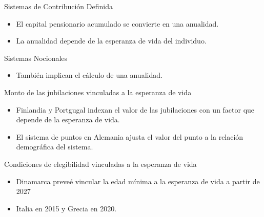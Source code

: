 \documentclass[ignorenonframetext,]{beamer}
\providecommand{\tightlist}{%
  \setlength{\itemsep}{0pt}\setlength{\parskip}{0pt}}
\begin{document}
\begin{frame}{Sistemas de Contribución Definida}

\begin{itemize}
\tightlist
\item
  El capital pensionario acumulado se convierte en una anualidad.
\item
  La anualidad depende de la esperanza de vida del individuo.
\end{itemize}

\end{frame}

\begin{frame}{Sistemas Nocionales}

\begin{itemize}
\tightlist
\item
  También implican el cálculo de una anualidad.
\end{itemize}

\end{frame}

\begin{frame}{Monto de las jubilaciones vinculadas a la esperanza de
vida}

\begin{itemize}
\tightlist
\item
  Finlandia y Portgugal indexan el valor de las jubilaciones con un
  factor que depende de la esperanza de vida.
\item
  El sistema de puntos en Alemania ajusta el valor del punto a la
  relación demográfica del sistema.
\end{itemize}

\end{frame}

\begin{frame}{Condiciones de elegibilidad vinculadas a la esperanza de
vida}

\begin{itemize}
\tightlist
\item
  Dinamarca preveé vincular la edad mínima a la esperanza de vida a
  partir de 2027
\item
  Italia en 2015 y Grecia en 2020.
\end{itemize}

\end{frame}
\end{document}
